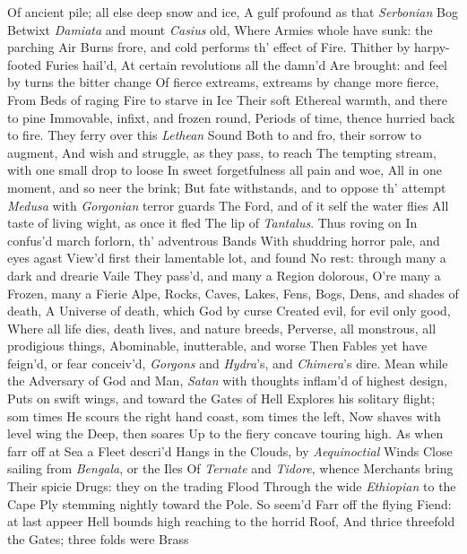 \documentclass[11pt]{book}
\newcounter {first}
\newcounter {last}
\begin{document}
Of ancient pile; all else deep snow and ice, 
A gulf profound as that \textit{Serbonian} Bog 
Betwixt \textit{Damiata} and mount \textit{Casius} old, 
Where Armies whole have sunk: the parching Air 
Burns frore, and cold performs th' effect of Fire. 
Thither by harpy-footed Furies hail'd, 
At certain revolutions all the damn'd 
Are brought: and feel by turns the bitter change 
Of fierce extreams, extreams by change more fierce, 
From Beds of raging Fire to starve in Ice 
Their soft Ethereal warmth, and there to pine 
Immovable, infixt, and frozen round, 
Periods of time, thence hurried back to fire. 
They ferry over this \textit{Lethean} Sound 
Both to and fro, their sorrow to augment, 
And wish and struggle, as they pass, to reach 
The tempting stream, with one small drop to loose 
In sweet forgetfulness all pain and woe, 
All in one moment, and so neer the brink; 
But fate withstands, and to oppose th' attempt 
\textit{Medusa} with \textit{Gorgonian} terror guards 
The Ford, and of it self the water flies 
All taste of living wight, as once it fled 
The lip of \textit{Tantalus}.  Thus roving on 
In confus'd march forlorn, th' adventrous Bands 
With shuddring horror pale, and eyes agast 
View'd first their lamentable lot, and found 
No rest: through many a dark and drearie Vaile 
They pass'd, and many a Region dolorous, 
O're many a Frozen, many a Fierie Alpe, 
Rocks, Caves, Lakes, Fens, Bogs, Dens, and shades of death, 
A Universe of death, which God by curse 
Created evil, for evil only good, 
Where all life dies, death lives, and nature breeds, 
Perverse, all monstrous, all prodigious things, 
Abominable, inutterable, and worse 
Then Fables yet have feign'd, or fear conceiv'd, 
\textit{Gorgons} and \textit{Hydra}'s, and \textit{Chimera}'s dire. 
\quad Mean while the Adversary of God and Man, 
\textit{Satan} with thoughts inflam'd of highest design, 
Puts on swift wings, and toward the Gates of Hell 
Explores his solitary flight; som times 
He scours the right hand coast, som times the left, 
Now shaves with level wing the Deep, then soares 
Up to the fiery concave touring high. 
As when farr off at Sea a Fleet descri'd 
Hangs in the Clouds, by \textit{Aequinoctial} Winds 
Close sailing from \textit{Bengala}, or the Iles 
Of \textit{Ternate} and \textit{Tidore}, whence Merchants bring 
Their spicie Drugs: they on the trading Flood 
Through the wide \textit{Ethiopian} to the Cape 
Ply stemming nightly toward the Pole.  So seem'd 
Farr off the flying Fiend: at last appeer 
Hell bounds high reaching to the horrid Roof, 
And thrice threefold the Gates; three folds were Brass 
\end{document}
